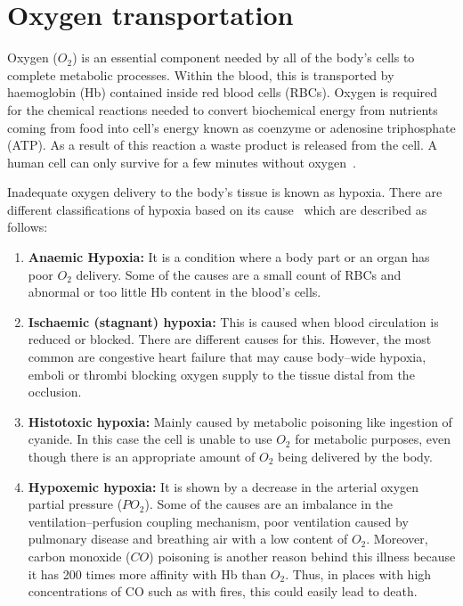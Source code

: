 \section{Oxygen transportation}
\label{section literature 1.2}
Oxygen ($O_2$) is an essential component needed by all of the body's cells to complete metabolic processes. Within the blood, this is transported by haemoglobin (Hb) contained inside red blood cells (RBCs). Oxygen is required for the chemical reactions needed to convert biochemical energy from nutrients coming from food into cell's energy known as coenzyme or adenosine triphosphate (ATP). As a result of this reaction a waste product is released from the cell. A human cell can only survive for a few minutes without oxygen~\cite{culmsee2005apoptosis}.

Inadequate oxygen delivery to the body's tissue is known as hypoxia. There are different classifications of hypoxia  based on its cause~\cite{marieb2007human} which are described as follows: 

\begin{enumerate}
    \item \textbf{Anaemic Hypoxia:} It is a condition where a body part or an organ has poor $O_2$ delivery. Some of the causes are a small count of RBCs and abnormal or too little Hb content in the blood's cells.
    \item \textbf{Ischaemic (stagnant) hypoxia: }This is caused when blood circulation is reduced or blocked. There are different causes for this. However, the most common are congestive heart failure that may cause body–wide hypoxia, emboli or thrombi blocking oxygen supply to the tissue distal from the occlusion. 
    \item \textbf{Histotoxic hypoxia: }Mainly caused by metabolic poisoning like ingestion of cyanide. In this case the cell is unable to use $O_2$ for metabolic purposes, even though there is an appropriate amount of $O_2$ being delivered by the body.
    \item \textbf{Hypoxemic hypoxia:} It is shown by a decrease in the arterial oxygen partial pressure ($PO_2$). Some of the causes are an imbalance in the ventilation–perfusion coupling mechanism, poor ventilation caused by pulmonary disease and breathing air with a low content of $O_2$. Moreover, carbon monoxide ($CO$) poisoning is another reason behind this illness because it has \num{200} times more affinity with Hb than $O_2$. Thus, in places with high concentrations of CO such as with fires, this could easily lead to death.
\end{enumerate}




